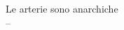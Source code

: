 \thispagestyle{empty}
\vspace*{5em}
\begin{center}
\large
Le arterie sono anarchiche\\ \vspace{0.05em} {\hspace{1.5cm}\small -- }
\end{center}